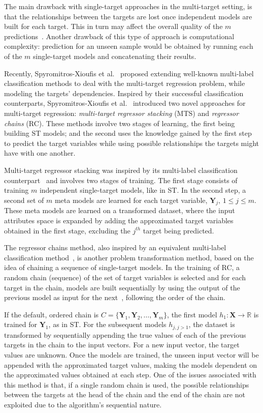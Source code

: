 \documentclass[reqno]{vcuthesis}
\numberwithin{equation}{chapter}
\begin{document}
The main drawback with single-target approaches in the multi-target setting, is that the relationships between the targets are lost once independent models are built for each target. This in turn may affect the overall quality of the $m$ predictions~\cite{Borchani2015}. Another drawback of this type of approach is computational complexity: prediction for an unseen sample would be obtained by running each of the $m$ single-target models and concatenating their results. 

Recently, Spyromitros-Xioufis et al.~\cite{Spyromitros2014} proposed extending well-known multi-label classification methods to deal with the multi-target regression problem, while modeling the targets' dependencies. Inspired by their successful classification counterparts, Spyromitros-Xioufis et al.~\cite{Spyromitros2014} introduced two novel approaches for multi-target regression: \textit{multi-target regressor stacking} (MTS) and \textit{regressor chains} (RC). These methods involve two stages of learning, the first being building ST models; and the second uses the knowledge gained by the first step to predict the target variables while using possible relationships the targets might have with one another. 

Multi-target regressor stacking was inspired by its multi-label classification counterpart~\cite{godbole2004discriminative} and involves two stages of training. The first stage consists of training $m$ independent single-target models, like in ST. In the second step, a second set of $m$ meta models are learned for each target variable, $\bm{Y}_j,\, 1 \leq j \leq m$. These meta models are learned on a transformed dataset, where the input attributes space is expanded by adding the approximated target variables obtained in the first stage, excluding the $j^{th}$ target being predicted.

The regressor chains method, also inspired by an equivalent multi-label classification method~\cite{read2011classifier}, is another problem transformation method, based on the idea of chaining a sequence of single-target models. In the training of RC, a random chain (sequence) of the set of target variables is selected and for each target in the chain, models are built sequentially by using the output of the previous model as input for the next~\cite{Xioufis2016}, following the order of the chain. 

If the default, ordered chain is $C = \{\bm Y_1, \bm Y_2, \ldots, \bm Y_m\}$, the first model $h_1 : \bm X \rightarrow \mathbb{R}$ is trained for $\bm Y_1$, as in ST. For the subsequent models $h_{j,j>1}$, the dataset is transformed by sequentially appending the true values of each of the previous targets in the chain to the input vectors. For a new input vector, the target values are unknown. Once the models are trained, the unseen input vector will be appended with the approximated target values, making the models dependent on the approximated values obtained at each step. One of the issues associated with this method is that, if a single random chain is used, the possible relationships between the targets at the head of the chain and the end of the chain are not exploited due to the algorithm's sequential nature. 
\end{document}
